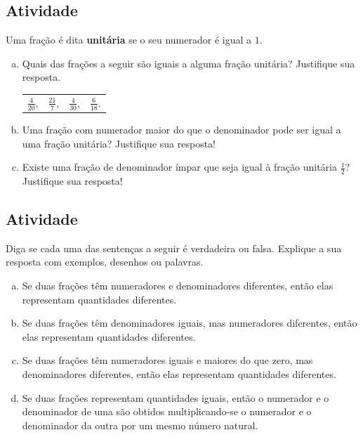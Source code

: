 \subsection{Atividade}

Uma fração é dita {\bf unitária} se o seu numerador é igual a $1$.
\begin{enumerate}[a)]
\item  Quais das frações a seguir são iguais a alguma fração unitária? Justifique sua resposta.

\begin{center}
\begin{tabular}{m{}m{}m{}m{}}
$\frac{4}{20}$, & $\frac{21}{7}$, & $\frac{4}{30}$, & $\frac{6}{18}$.
\end{tabular}
\end{center}

\item  Uma fração com numerador maior do que o denominador pode ser igual a uma fração unitária? Justifique sua resposta!

\item  Existe uma fração de denominador ímpar que seja igual à fração unitária $\frac{1}{2}$? Justifique sua resposta!
\end{enumerate}

\subsection{Atividade}

Diga se cada uma das sentenças a seguir é verdadeira ou falsa. Explique a sua resposta com exemplos, desenhos ou palavras.
\begin{enumerate}[a)]
 \item  Se duas frações têm numeradores e denominadores diferentes, então elas representam quantidades diferentes.
 \item Se duas frações têm denominadores iguais, mas numeradores diferentes, então elas representam quantidades diferentes.
 \item Se duas frações têm numeradores iguais e maiores do que zero, mas denominadores diferentes, então elas representam quantidades diferentes.
 \item Se duas frações representam quantidades iguais, então o numerador e o denominador de uma são obtidos multiplicando-se o numerador e o denominador da outra por um mesmo número natural.
\end{enumerate}


